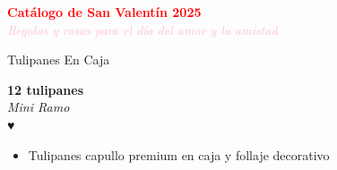 \documentclass[12pt]{article}
\begin{document}
\begin{center}
    \Huge\textbf{\textcolor{red}{Catálogo de San Valentín 2025}} \\[0.5cm]
    \large\textit{\textcolor{pink}{Regalos y rosas para el día del amor y la amistad}} \\[1cm]
\end{center}

\begin{center}\textcolor[HTML]{191970}{\huge Tulipanes En Caja}\end{center}
\noindent
\begin{minipage}{0.6\textwidth}
    \textcolor[HTML]{FF8C00}{\textbf{\huge 12 tulipanes }}\\
    {\textit{Mini Ramo}} \\
    \textcolor[HTML]{FF8C00}{\Huge ♥} \\
    \vspace{0.5cm}
    \begin{itemize}
        \item Tulipanes capullo premium en caja y follaje decorativo
    \end{itemize}
\end{minipage}
\hspace{1cm}
\end{document}
